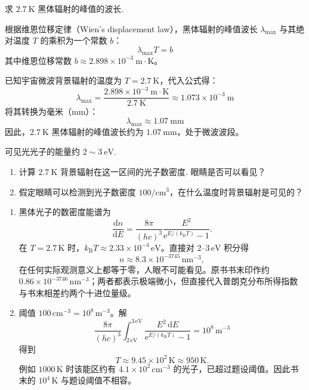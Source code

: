 \begin{exercise}\label{ex:32.2}
求 $2.7 \ \mathrm{K}$ 黑体辐射的峰值的波长.
\end{exercise}
\begin{solution}
根据维恩位移定律（Wien's displacement law），黑体辐射的峰值波长 $\lambda_{\max}$ 与其绝对温度 $T$ 的乘积为一个常数 $b$：
$$ \lambda_{\max} T = b $$
其中维恩位移常数 $b \approx 2.898 \times 10^{-3} \ \mathrm{m \cdot K}$。

已知宇宙微波背景辐射的温度为 $T = 2.7 \ \mathrm{K}$，代入公式得：
$$ \lambda_{\max} = \frac{2.898 \times 10^{-3} \ \mathrm{m \cdot K}}{2.7 \ \mathrm{K}} \approx 1.073 \times 10^{-3} \ \mathrm{m} $$
将其转换为毫米（$\mathrm{mm}$）：
$$ \lambda_{\max} \approx 1.07 \ \mathrm{mm} $$
因此，$2.7 \ \mathrm{K}$ 黑体辐射的峰值波长约为 $1.07 \ \mathrm{mm}$，处于微波波段。
\end{solution}

\begin{exercise}\label{ex:32.3}
可见光光子的能量约 $2 \sim 3 \ \mathrm{eV}$. 
\begin{enumerate}
  \item[(a)] 计算 $2.7 \ \mathrm{K}$ 背景辐射在这一区间的光子数密度. 眼睛是否可以看见？
  \item[(b)] 假定眼睛可以检测到光子数密度 $100/\mathrm{cm^3}$，在什么温度时背景辐射是可见的？
\end{enumerate}
\end{exercise}
\begin{solution}
\begin{enumerate}
\item[(a)] 黑体光子的数密度能谱为
$$
\frac{\mathrm{d}n}{\mathrm{d}E}=\frac{8\pi}{(hc)^3}\frac{E^2}{\mathrm{e}^{E/(k_{\mathrm{B}}T)}-1}.
$$
在 $T=2.7\,\mathrm K$ 时，$k_{\mathrm{B}}T\approx2.33\times10^{-4}\,\mathrm{eV}$。直接对 $2$--$3\,\mathrm{eV}$ 积分得
$$
\boxed{n\approx8.3\times10^{-3745}\,\mathrm{nm^{-3}}},
$$
在任何实际观测意义上都等于零，人眼不可能看见。原书书末印作约 $0.86\times10^{-3746}\,\mathrm{nm^{-3}}$；两者都表示极端微小，但直接代入普朗克分布所得指数与书末相差约两个十进位量级。
\item[(b)] 阈值 $100\,\mathrm{cm^{-3}}=10^8\,\mathrm{m^{-3}}$。解
$$
\frac{8\pi}{(hc)^3}\int_{2\,\mathrm{eV}}^{3\,\mathrm{eV}}\frac{E^2\,\mathrm{d}E}{\mathrm{e}^{E/(k_{\mathrm{B}}T)}-1}=10^8\,\mathrm{m^{-3}}
$$
得到
$$
\boxed{T\approx9.45\times10^2\,\mathrm K\approx950\,\mathrm K}.
$$
例如 $1000\,\mathrm K$ 时该能区约有 $4.1\times10^2\,\mathrm{cm^{-3}}$ 的光子，已超过题设阈值。因此书末的 $10^4\,\mathrm K$ 与题设阈值不相容。
\end{enumerate}
\end{solution}


